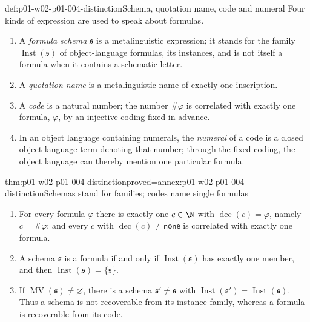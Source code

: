 \begin{hbdefinition}{def:p01-w02-p01-004-distinction}{Schema, quotation name, code and numeral}
Four kinds of expression are used to speak about formulas.
\begin{enumerate}
  \item A \emph{formula schema} \(\mathfrak s\) is a metalinguistic
        expression; it stands for the family
        \(\operatorname{Inst}(\mathfrak s)\) of object-language formulas,
        its instances, and is not itself a formula when it contains a
        schematic letter.
  \item A \emph{quotation name} is a metalinguistic name of exactly one
        inscription.
  \item A \emph{code} is a natural number; the number \(\#\varphi\) is
        correlated with exactly one formula, \(\varphi\), by an injective
        coding fixed in advance.
  \item In an object language containing numerals, the \emph{numeral} of a
        code is a closed object-language term denoting that number; through
        the fixed coding, the object language can thereby mention one
        particular formula.
\end{enumerate}
\end{hbdefinition}

\begin{hbtheorem}{thm:p01-w02-p01-004-distinction}{proved=annex:p01-w02-p01-004-distinction}{Schemas stand for families; codes name single formulas}
\begin{enumerate}
  \item For every formula \(\varphi\) there is exactly one \(c\in\N\) with
        \(\operatorname{dec}(c)=\varphi\), namely \(c=\#\varphi\); and every
        \(c\) with \(\operatorname{dec}(c)\ne\mathsf{none}\) is correlated
        with exactly one formula.
  \item A schema \(\mathfrak s\) is a formula if and only if
        \(\operatorname{Inst}(\mathfrak s)\) has exactly one member, and
        then \(\operatorname{Inst}(\mathfrak s)=\{\mathfrak s\}\).
  \item If \(\operatorname{MV}(\mathfrak s)\ne\varnothing\), there is a
        schema \(\mathfrak s'\ne\mathfrak s\) with
        \(\operatorname{Inst}(\mathfrak s')=\operatorname{Inst}(\mathfrak
        s)\). Thus a schema is not recoverable from its instance family,
        whereas a formula is recoverable from its code.
\end{enumerate}
\end{hbtheorem}

